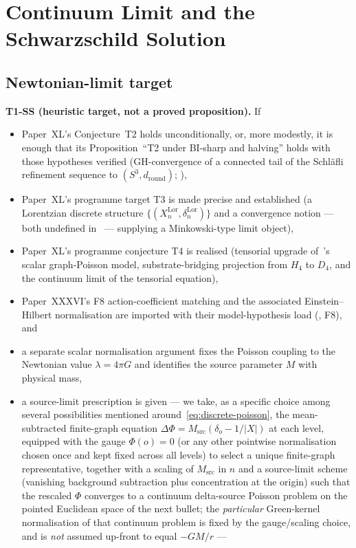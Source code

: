 \documentclass[12pt]{article}
\theoremstyle{definition}
\theoremstyle{remark}
\begin{document}
\section{Continuum Limit and the Schwarzschild Solution}\label{sec:continuum}

\subsection{Newtonian-limit target}

\textbf{T1-SS (heuristic target, not a proved proposition).} If
\begin{itemize}
\item Paper~XL's Conjecture~T2 holds unconditionally, or, more modestly, it is enough that its Proposition~``T2 under BI-sharp and halving'' holds with those hypotheses verified (GH-convergence of a connected tail of the Schl\"afli refinement sequence to $(S^3, d_{\mathrm{round}})$; \citealt{SmartXL}),
\item Paper~XL's programme target T3 is made precise and established (a Lorentzian discrete structure $\{(X_n^{\mathrm{Lor}}, \delta_n^{\mathrm{Lor}})\}$ and a convergence notion --- both undefined in~\citep{SmartXL} --- supplying a Minkowski-type limit object),
\item Paper~XL's programme conjecture T4 is realised (tensorial upgrade of~\citep{SmartXXVII}'s scalar graph-Poisson model, substrate-bridging projection from $H_4$ to $D_4$, and the continuum limit of the tensorial equation),
\item Paper~XXXVI's F8 action-coefficient matching and the associated Einstein--Hilbert normalisation are imported with their model-hypothesis load (\citealt{SmartXXXVI}, F8), and
\item a separate scalar normalisation argument fixes the Poisson coupling to the Newtonian value $\lambda = 4\pi G$ and identifies the source parameter $M$ with physical mass,
\item a source-limit prescription is given --- we take, as a specific choice among several possibilities mentioned around~\eqref{eq:discrete-poisson}, the mean-subtracted finite-graph equation $\Delta \Phi = M_{\mathrm{src}}(\delta_o - 1/|X|)$ at each level, equipped with the gauge $\Phi(o) = 0$ (or any other pointwise normalisation chosen once and kept fixed across all levels) to select a unique finite-graph representative, together with a scaling of $M_{\mathrm{src}}$ in $n$ and a source-limit scheme (vanishing background subtraction plus concentration at the origin) such that the rescaled $\Phi$ converges to a continuum delta-source Poisson problem on the pointed Euclidean space of the next bullet; the \emph{particular} Green-kernel normalisation of that continuum problem is fixed by the gauge/scaling choice, and is \emph{not} assumed up-front to equal $-GM/r$ ---

\end{itemize}
\end{document}
